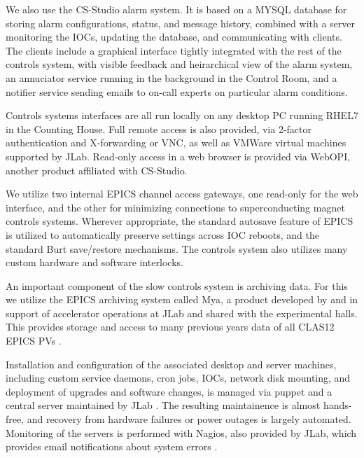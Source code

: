 We also use the CS-Studio alarm system.  It is based on a MYSQL database for storing alarm configurations, status, and message history, combined with a server monitoring the IOCs, updating the database, and communicating with clients.  The clients include a graphical interface tightly integrated with the rest of the controls system, with visible feedback and heirarchical view of the alarm system, an annuciator service running in the background in the Control Room, and a notifier service sending emails to on-call experts on particular alarm conditions.

Controls systems interfaces are all run locally on any desktop PC running RHEL7 in the Counting House.  Full remote access is also provided, via 2-factor authentication and X-forwarding or VNC, as well as VMWare virtual machines supported by JLab.  Read-only access in a web browser is provided via WebOPI, another product affiliated with CS-Studio.

We utilize two internal EPICS channel access gateways, one read-only for the web interface, and the other for minimizing connections to superconducting magnet controls systems.  Wherever appropriate, the standard autosave feature of EPICS is utilized to automatically preserve settings across IOC reboots, and the standard Burt save/restore mechanisms.  The controls system also utilizes many custom hardware and software interlocks.

An important component of the slow controls system is archiving data.  For this we utilize the EPICS archiving system called Mya, a product developed by and in support of accelerator operations at JLab and shared with the experimental halls.  This provides storage and access to many previous years data of all CLAS12 EPICS PVs \cite{mya}.

Installation and configuration of the associated desktop and server machines, including custom service daemons, cron jobs, IOCs, network disk mounting, and deployment of upgrades and software changes, is managed via puppet and a central server maintained by JLab \cite{puppet-website}. The resulting maintainence is almost hands-free, and recovery from hardware failures or power outages is largely automated.  Monitoring of the servers is performed with Nagios, also provided by JLab, which provides email notifications about system errors \cite{nagios-website}.

